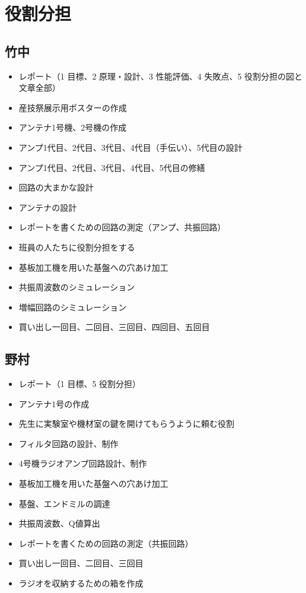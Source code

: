 \documentclass[report.tex]{subfiles}
\begin{document}
\section{役割分担}

\subsection{竹中}

\begin{itemize}
	\item レポート（1 目標、2 原理・設計、3 性能評価、4 失敗点、5 役割分担の図と文章全部）
	\item 産技祭展示用ポスターの作成
	\item アンテナ1号機、2号機の作成
	\item アンプ1代目、2代目、3代目、4代目（手伝い）、5代目の設計
	\item アンプ1代目、2代目、3代目、4代目、5代目の修繕
	\item 回路の大まかな設計
	\item アンテナの設計
	\item レポートを書くための回路の測定（アンプ、共振回路）
	\item 班員の人たちに役割分担をする
	\item 基板加工機を用いた基盤への穴あけ加工
	\item 共振周波数のシミュレーション
	\item 増幅回路のシミュレーション
	\item 買い出し一回目、二回目、三回目、四回目、五回目
\end{itemize}

\subsection{野村}

\begin{itemize}
	\item レポート（1 目標、5 役割分担）
	\item アンテナ1号の作成
	\item 先生に実験室や機材室の鍵を開けてもらうように頼む役割
	\item フィルタ回路の設計、制作
	\item 4号機ラジオアンプ回路設計、制作
	\item 基板加工機を用いた基盤への穴あけ加工
	\item 基盤、エンドミルの調達
	\item 共振周波数、Q値算出
	\item レポートを書くための回路の測定（共振回路）
	\item 買い出し一回目、二回目、三回目
	\item ラジオを収納するための箱を作成
\end{itemize}
\end{document}
